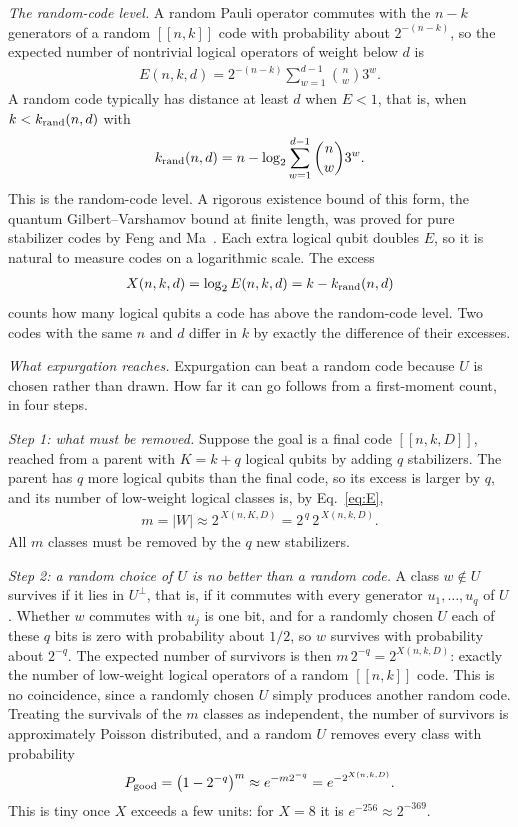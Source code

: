 \documentclass[reprint,pra,superscriptaddress,nofootinbib]{revtex4-2}
\begin{document}
\emph{The random-code level.} A random Pauli operator commutes with the $n-k$ generators of a random $[[n,k]]$ code
with probability about $2^{-(n-k)}$, so the expected number of nontrivial logical operators of weight below $d$ is
\begin{align}
E(n,k,d)=2^{-(n-k)}\sum_{w=1}^{d-1}\binom{n}{w}3^{w}.\label{eq:E}
\end{align}
A random code typically has distance at least $d$ when $E<1$, that is, when $k<k_{\rm rand}(n,d)$ with
\begin{align}
k_{\rm rand}(n,d)=n-\log_2\sum_{w=1}^{d-1}\binom{n}{w}3^{w}.
\end{align}
This is the random-code level. A rigorous existence bound of this form, the quantum Gilbert--Varshamov bound at finite length, was proved for pure stabilizer codes by Feng and Ma~\cite{fengma}. Each extra logical qubit doubles $E$, so it is natural to measure codes on a logarithmic scale. The excess
\begin{align}
X(n,k,d)=\log_2 E(n,k,d)=k-k_{\rm rand}(n,d)
\end{align}
counts how many logical qubits a code has above the random-code level. Two codes with the same $n$ and $d$ differ in
$k$ by exactly the difference of their excesses.

\emph{What expurgation reaches.} Expurgation can beat a random code because $U$ is chosen rather than drawn. How far
it can go follows from a first-moment count, in four steps.

\emph{Step 1: what must be removed.} Suppose the goal is a final code $[[n,k,D]]$, reached from a parent with
$K=k+q$ logical qubits by adding $q$ stabilizers. The parent has $q$ more logical qubits than the final code, so its
excess is larger by $q$, and its number of low-weight logical classes is, by Eq.~\eqref{eq:E},
\begin{align}
m=|W|\approx 2^{\,X(n,K,D)}=2^{\,q}\,2^{\,X(n,k,D)}.
\end{align}
All $m$ classes must be removed by the $q$ new stabilizers.

\emph{Step 2: a random choice of $U$ is no better than a random code.} A class $w\notin U$ survives if it lies in
$U^{\perp}$, that is, if it commutes with every generator $u_1,\dots,u_q$ of $U$. Whether $w$ commutes with $u_j$ is
one bit, and for a randomly chosen $U$ each of these $q$ bits is zero with probability about $1/2$, so $w$ survives with
probability about $2^{-q}$. The expected number of survivors is then $m\,2^{-q}=2^{X(n,k,D)}$: exactly the number of
low-weight logical operators of a random $[[n,k]]$ code. This is no coincidence, since a randomly chosen $U$ simply
produces another random code. Treating the survivals of the $m$ classes as independent, the number of survivors is
approximately Poisson distributed, and a random $U$ removes every class with probability
\begin{align}
P_{\rm good}=\bigl(1-2^{-q}\bigr)^{m}\approx e^{-m2^{-q}}=e^{-2^{X(n,k,D)}}.
\end{align}
This is tiny once $X$ exceeds a few units: for $X=8$ it is $e^{-256}\approx2^{-369}$.
\end{document}
